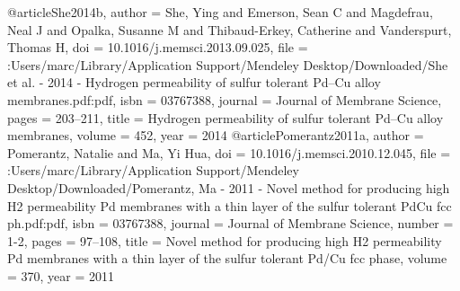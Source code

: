 @article{She2014b,
author = {She, Ying and Emerson, Sean C and Magdefrau, Neal J and Opalka, Susanne M and Thibaud-Erkey, Catherine and Vanderspurt, Thomas H},
doi = {10.1016/j.memsci.2013.09.025},
file = {:Users/marc/Library/Application Support/Mendeley Desktop/Downloaded/She et al. - 2014 - Hydrogen permeability of sulfur tolerant Pd–Cu alloy membranes.pdf:pdf},
isbn = {03767388},
journal = {Journal of Membrane Science},
pages = {203--211},
title = {{Hydrogen permeability of sulfur tolerant Pd–Cu alloy membranes}},
volume = {452},
year = {2014}
}
@article{Pomerantz2011a,
author = {Pomerantz, Natalie and Ma, Yi Hua},
doi = {10.1016/j.memsci.2010.12.045},
file = {:Users/marc/Library/Application Support/Mendeley Desktop/Downloaded/Pomerantz, Ma - 2011 - Novel method for producing high H2 permeability Pd membranes with a thin layer of the sulfur tolerant PdCu fcc ph.pdf:pdf},
isbn = {03767388},
journal = {Journal of Membrane Science},
number = {1-2},
pages = {97--108},
title = {{Novel method for producing high H2 permeability Pd membranes with a thin layer of the sulfur tolerant Pd/Cu fcc phase}},
volume = {370},
year = {2011}
}
